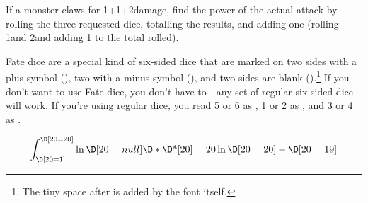\documentclass{article}
\begin{document}
If a monster claws for 1\D[6]+1+2\D[4] damage, find the power of the actual attack by rolling the three requested dice, totalling the results, and adding one (rolling 1\D[6] and 2\D[4] and adding 1 to the total rolled).

Fate dice are a special kind of six-sided dice that are marked on two sides with a plus symbol (\D[fd=+]), two with a minus symbol (\D[fd=-]), and two sides are blank (\D[fd=0]).\footnote{The tiny space after \FD[0] is added by the font itself.}
If you don't want to use Fate dice, you don't have to---any set of regular six-sided dice will work.
If you're using regular dice, you read 5 or 6 as \D[fds=+], 1 or 2 as \D[fds=-], and 3 or 4 as \D[fds=0].

\[
  \int_{\D[20=1]}^{\D[20=20]} \ln \D[20=null] \D* \text{\D*[20]} = 20 \ln \D[20=20] - \D[20=19]
\]
\end{document}
